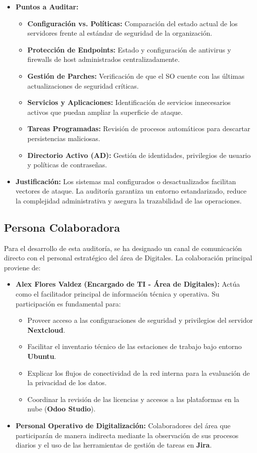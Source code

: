 \documentclass[12pt]{article}
\begin{document}
\begin{itemize}
    \item \textbf{Puntos a Auditar:}
    \begin{itemize}
        \item \textbf{Configuración vs. Políticas:} Comparación del estado actual de los servidores frente al estándar de seguridad de la organización.
        \item \textbf{Protección de Endpoints:} Estado y configuración de antivirus y firewalls de host administrados centralizadamente.
        \item \textbf{Gestión de Parches:} Verificación de que el SO cuente con las últimas actualizaciones de seguridad críticas.
        \item \textbf{Servicios y Aplicaciones:} Identificación de servicios innecesarios activos que puedan ampliar la superficie de ataque.
        \item \textbf{Tareas Programadas:} Revisión de procesos automáticos para descartar persistencias maliciosas.
        \item \textbf{Directorio Activo (AD):} Gestión de identidades, privilegios de usuario y políticas de contraseñas.
    \end{itemize}
    \item \textbf{Justificación:} Los sistemas mal configurados o desactualizados facilitan vectores de ataque. La auditoría garantiza un entorno estandarizado, reduce la complejidad administrativa y asegura la trazabilidad de las operaciones.
\end{itemize}
\subsection{Persona Colaboradora}
Para el desarrollo de esta auditoría, se ha designado un canal de comunicación directo con el personal estratégico del área de Digitales. La colaboración principal proviene de:

\begin{itemize}
    \item \textbf{Alex Flores Valdez (Encargado de TI - Área de Digitales):} Actúa como el facilitador principal de información técnica y operativa. Su participación es fundamental para:
    \begin{itemize}
        \item Proveer acceso a las configuraciones de seguridad y privilegios del servidor \textbf{Nextcloud}.
        \item Facilitar el inventario técnico de las estaciones de trabajo bajo entorno \textbf{Ubuntu}.
        \item Explicar los flujos de conectividad de la red interna para la evaluación de la privacidad de los datos.
        \item Coordinar la revisión de las licencias y accesos a las plataformas en la nube (\textbf{Odoo Studio}).
    \end{itemize}
    \item \textbf{Personal Operativo de Digitalización:} Colaboradores del área que participarán de manera indirecta mediante la observación de sus procesos diarios y el uso de las herramientas de gestión de tareas en \textbf{Jira}.
\end{itemize}
\end{document}
